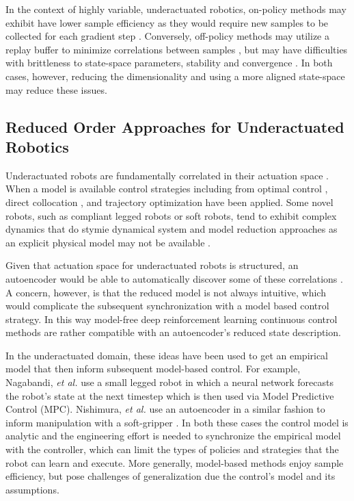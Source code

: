 \documentclass{article}
\begin{document}
In the context of highly variable, underactuated robotics, on-policy methods may exhibit have lower sample efficiency as they would require new samples to be collected for each gradient step \cite{SAC}.
Conversely, off-policy methods may utilize a replay buffer to minimize correlations between samples \cite{DDPG}, but may have difficulties with brittleness to state-space parameters, stability and convergence \cite{bhatnagar2009convergent}.
In both cases, however, reducing the dimensionality and using a more aligned state-space may reduce these issues. 

\subsection{Reduced Order Approaches for Underactuated Robotics}

Underactuated robots are fundamentally correlated in their actuation space  \cite{tedrake2009underactuated}.
When a model is available control strategies including from optimal control \cite{betts2010practical}, direct collocation \cite{von1993numerical}, and trajectory optimization \cite{kalakrishnan2011stomp} have been applied.
Some novel robots, such as compliant legged robots or soft robots, tend to exhibit complex dynamics that do stymie dynamical system and model reduction approaches as an explicit physical model may not be available \cite{nakajima2015information}.

Given that actuation space for underactuated robots is structured, an autoencoder would be able to automatically discover some of these correlations \cite{AE_hinton2006reducing,ngsparse}.
A concern, however, is that the reduced model is not always intuitive, which would complicate the subsequent synchronization with a model based control strategy.
In this way model-free deep reinforcement learning continuous control methods are rather compatible with an autoencoder's reduced state description.

In the underactuated domain, these ideas have been used to get an empirical model that then inform subsequent model-based control.
For example, Nagabandi, \emph{et al.} \cite{nagabandi2018learning} use a small legged robot in which a neural network forecasts the robot's state at the next timestep which is then used via Model Predictive Control (MPC).
Nishimura, \emph{et al.} use an autoencoder in a similar fashion to inform manipulation with a soft-gripper \cite{nishimura2017thin}.
In both these cases the control model is analytic and the engineering effort is needed to synchronize the empirical model with the controller, which can limit the types of policies and strategies that the robot can learn and execute.  
More generally, model-based methods enjoy sample efficiency, but pose challenges of generalization due the control's model and its assumptions.  
\end{document}
